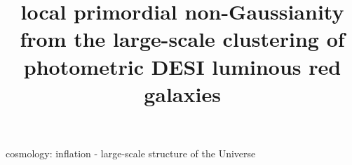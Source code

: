 \documentclass[fleqn, usenatbib]{mnras}
\title[PNG with DESI Imaging]{local primordial non-Gaussianity from the large-scale clustering of photometric DESI luminous red galaxies}
\begin{document}
\label{firstpage}
\pagerange{\pageref{firstpage}--\pageref{lastpage}}
\maketitle




\begin{keywords}
cosmology: inflation - large-scale structure of the Universe
\end{keywords}











 
%

\bsp	%
\label{lastpage}
\end{document}
